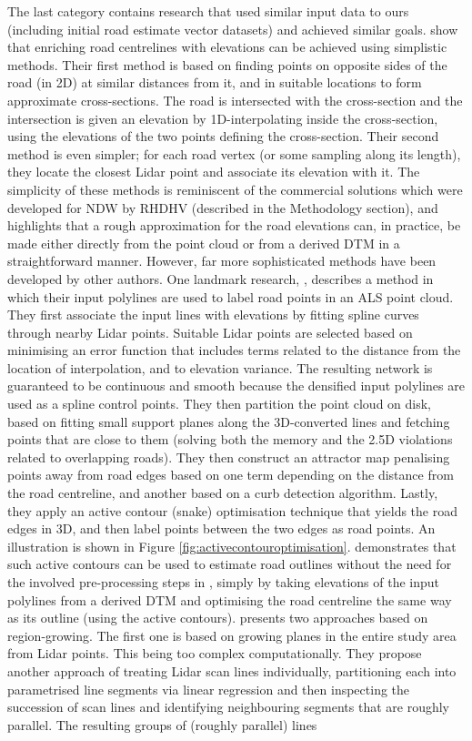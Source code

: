 The last category contains research that used similar input data to ours (including initial road estimate vector datasets) and achieved similar goals. \cite{cai_rasdorf_2008} show that enriching road centrelines with elevations can be achieved using simplistic methods. Their first method is based on finding points on opposite sides of the road (in 2D) at similar distances from it, and in suitable locations to form approximate cross-sections. The road is intersected with the cross-section and the intersection is given an elevation by 1D-interpolating inside the cross-section, using the elevations of the two points defining the cross-section. Their second method is even simpler; for each road vertex  (or some sampling along its length), they locate the closest Lidar point and associate its elevation with it. The simplicity of these methods is reminiscent of the commercial solutions which were developed for NDW by RHDHV (described in the Methodology section), and highlights that a rough approximation for the road elevations can, in practice, be made either directly from the point cloud or from a derived DTM in a straightforward manner. However, far more sophisticated methods have been developed by other authors. One landmark research, \cite{boyko_funkhauser_2011}, describes a method in which their input polylines are used to label road points in an ALS point cloud. They first associate the input lines with elevations by fitting spline curves through nearby Lidar points. Suitable Lidar points are selected based on minimising an error function that includes terms related to the distance from the location of interpolation, and to elevation variance. The resulting network is guaranteed to be continuous and smooth because the densified input polylines are used as a spline control points. They then partition the point cloud on disk, based on fitting small support planes along the 3D-converted lines and fetching points that are close to them (solving both the memory and the 2.5D violations related to overlapping roads). They then construct an attractor map penalising points away from road edges based on one term depending on the distance from the road centreline, and another based on a curb detection algorithm. Lastly, they apply an active contour (snake) optimisation technique that yields the road edges in 3D, and then label points between the two edges as road points. An illustration is shown in Figure \ref{fig:activecontouroptimisation}. \cite{gopfert_etal_2011} demonstrates that such active contours can be used to estimate road outlines without the need for the involved pre-processing steps in \cite{boyko_funkhauser_2011}, simply by taking elevations of the input polylines from a derived DTM and optimising the road centreline the same way as its outline (using the active contours). \cite{hatger_brenner_2003} presents two approaches based on region-growing. The first one is based on growing planes in the entire study area from Lidar points. This being too complex computationally. They propose another approach of treating Lidar scan lines individually, partitioning each into parametrised line segments via linear regression and then inspecting the succession of scan lines and identifying neighbouring segments that are roughly parallel. The resulting groups of (roughly parallel) lines 